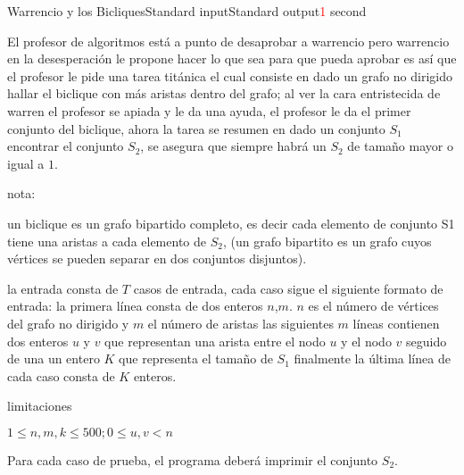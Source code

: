 \begin{problem}{Warrencio y los Bicliques}{Standard input}{Standard output}{\textcolor{red}{1} second}{}


El profesor de algoritmos está a punto de desaprobar a warrencio pero warrencio en la desesperación le propone hacer lo que sea para que pueda aprobar es así que el profesor le pide una tarea titánica el cual consiste en dado un grafo no dirigido hallar el biclique con más aristas dentro del grafo; al ver la cara entristecida de warren el profesor se apiada  y le da una ayuda, el profesor le da el primer conjunto del biclique, ahora la tarea se resumen en dado un conjunto $S_1$ encontrar el conjunto $S_2$, se asegura que siempre habrá un $S_2$ de tamaño mayor o igual a $1$. 

nota:

un biclique es un grafo bipartido completo, es decir cada elemento de conjunto S1 tiene una aristas a cada elemento de $S_2$, (un grafo bipartito es un grafo cuyos vértices se pueden separar en dos conjuntos disjuntos).

\InputFile
la entrada consta de $T$ casos de entrada, cada caso sigue el siguiente formato de entrada: 
la primera línea consta de dos  enteros $n$,$m$. $n$ es el número de vértices del grafo no dirigido y $m$ el número de aristas las siguientes $m$ líneas contienen dos enteros $u$ y $v$ que representan una arista entre el nodo $u$ y el nodo $v$ seguido de una un entero $K$ que representa el tamaño de $S_1$ finalmente la última línea de cada caso consta de $K$ enteros. 

limitaciones 

$1 \leq n,m,k \leq 500; 0 \leq u,v<n $ 

\OutputFile
Para cada caso de prueba, el programa deber\'a imprimir el conjunto $S_2$.

\Example

\begin{example}
\end{example}

\end{problem}
